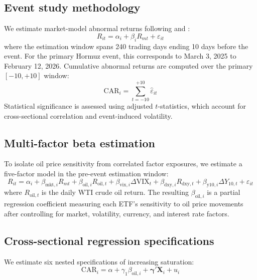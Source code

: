 \documentclass[12pt,preprint,authoryear]{elsarticle}
\begin{document}
\subsection{Event study methodology}
We estimate market-model abnormal returns following \citet{brown1985daily} and \citet{mackinlay1997event}:
\begin{equation}
    R_{it} = \alpha_i + \beta_i R_{mt} + \varepsilon_{it}
\end{equation}
where the estimation window spans 240 trading days ending 10 days before the event. For the primary Hormuz event, this corresponds to March 3, 2025 to February 12, 2026. Cumulative abnormal returns are computed over the primary $[-10, +10]$ window:
\begin{equation}
    \text{CAR}_i = \sum_{t=-10}^{+10} \hat{\varepsilon}_{it}
\end{equation}
Statistical significance is assessed using \citet{kolari2010event} adjusted $t$-statistics, which account for cross-sectional correlation and event-induced volatility.

\subsection{Multi-factor beta estimation}
To isolate oil price sensitivity from correlated factor exposures, we estimate a five-factor model in the pre-event estimation window:
\begin{equation}
    R_{it} = \alpha_i + \beta_{\text{mkt},i} R_{mt} + \beta_{\text{oil},i} R_{\text{oil},t} + \beta_{\text{vix},i} \Delta\text{VIX}_t + \beta_{\text{dxy},i} R_{\text{dxy},t} + \beta_{\text{y10},i} \Delta Y_{10,t} + \varepsilon_{it}
\end{equation}
where $R_{\text{oil},t}$ is the daily WTI crude oil return. The resulting $\beta_{\text{oil},i}$ is a partial regression coefficient measuring each ETF's sensitivity to oil price movements after controlling for market, volatility, currency, and interest rate factors.

\subsection{Cross-sectional regression specifications}
We estimate six nested specifications of increasing saturation:
\begin{equation}
    \text{CAR}_i = \alpha + \gamma_1 \beta_{\text{oil},i} + \boldsymbol{\gamma}' \mathbf{X}_i + u_i
\end{equation}
\end{document}
